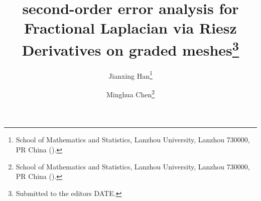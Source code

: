 

\usepackage{lipsum}
\usepackage{amsfonts}
\usepackage{graphicx}
\usepackage{epstopdf}
\usepackage{algorithmic}
\ifpdf
\else
\fi

\newcommand{\creflastconjunction}{, and~}



\title{second-order error analysis for Fractional Laplacian via Riesz Derivatives on graded meshes\thanks{Submitted to the editors DATE.
}}

\author{Jianxing Han\thanks{School of Mathematics and Statistics, Lanzhou University, Lanzhou 730000, PR China
  ().}
  \and Minghua Chen\thanks{School of Mathematics and Statistics, Lanzhou University, Lanzhou 730000, PR China 
  ().}
}

\usepackage{amsopn}
\DeclareMathOperator{\diag}{diag}


